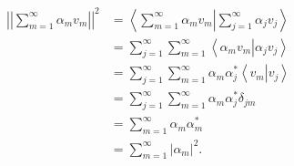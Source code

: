 \begin{questions}
\begin{solution}
\begin{align*}
\left|\left|\sum_{m=1}^{\infty}\alpha_mv_m\right|\right|^2&=\left< \sum_{m=1}^{\infty}\alpha_mv_m \left|\right. \sum_{j=1}^{\infty}\alpha_jv_j \right>\\
&=\sum_{j=1}^{\infty}\sum_{m=1}^{\infty}\left< \alpha_mv_m \left|\right. \alpha_jv_j \right>\\
&=\sum_{j=1}^{\infty}\sum_{m=1}^{\infty}\alpha_m\alpha_j^*\left< v_m \left|\right. v_j \right>\\
&=\sum_{j=1}^{\infty}\sum_{m=1}^{\infty}\alpha_m\alpha_j^*\delta_{jm}\\
&=\sum_{m=1}^{\infty}\alpha_m\alpha_m^*\\
&=\sum_{m=1}^{\infty}|\alpha_m|^2.
\end{align*}
\end{solution}

\end{questions}